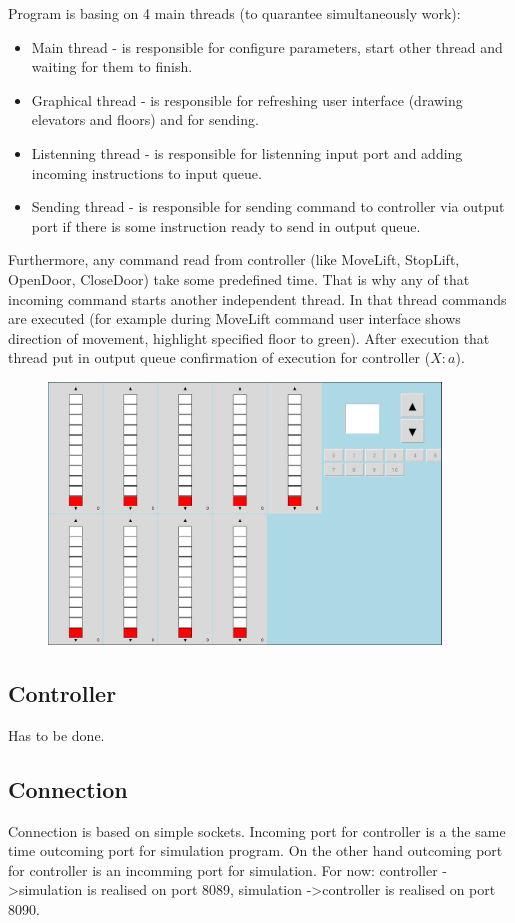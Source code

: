 \documentclass[12pt]{article}
\begin{document}
Program is basing on 4 main threads (to quarantee simultaneously work): 
\begin{itemize}
	\item Main thread - is responsible for configure parameters, start other thread and waiting for them to finish.
	\item Graphical thread - is responsible for refreshing user interface (drawing elevators and floors) and for sending. 
	\item Listenning thread - is responsible for listenning input port and adding incoming instructions to input queue.
	\item Sending thread - is responsible for sending command to controller via output port if there is some instruction ready to send in output queue.		
\end{itemize}

Furthermore, any command read from controller (like MoveLift, StopLift, OpenDoor, CloseDoor) take some predefined time. That is why any of that incoming command starts another independent thread. In that thread commands are executed (for example during MoveLift command user interface shows direction of movement, highlight specified floor to green). After execution that thread put in output queue confirmation of execution for controller ($X:a$).
	\begin{figure}
	\includegraphics[width=0.93\textwidth]{img/winda.png}
	\end{figure}

\subsection{Controller}
Has to be done.

\subsection{Connection}
Connection is based on simple sockets. Incoming port for controller is a the same time outcoming port for simulation program. On the other hand outcoming port for controller is an incomming port for simulation.
\newline
\newline
For now:
\newline
controller -\textgreater simulation is realised on port 8089,
\newline
simulation -\textgreater controller is realised on port 8090.
\end{document}
